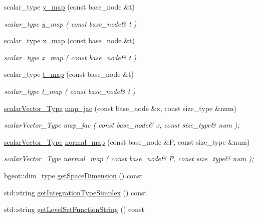 \begin{DoxyCompactItemize}
scalar\-\_\-type \hyperlink{classLevelSetData_aa4cda1cced4bc385d85383b40bbc2631}{y\-\_\-map} (const base\-\_\-node \&t)
\begin{DoxyCompactList}\small\item\em scalar\-\_\-type y\-\_\-map ( const base\-\_\-node\& t ) \end{DoxyCompactList}\item 
scalar\-\_\-type \hyperlink{classLevelSetData_ae7f10d3f10b72fbb6f703ba7aa8fe17b}{x\-\_\-map} (const base\-\_\-node \&t)
\begin{DoxyCompactList}\small\item\em scalar\-\_\-type x\-\_\-map ( const base\-\_\-node\& t ) \end{DoxyCompactList}\item 
scalar\-\_\-type \hyperlink{classLevelSetData_ac5307b31e9aff44c3e0d7cb848c17949}{t\-\_\-map} (const base\-\_\-node \&t)
\begin{DoxyCompactList}\small\item\em scalar\-\_\-type t\-\_\-map ( const base\-\_\-node\& t ) \end{DoxyCompactList}\item 
\hyperlink{Core_8h_a4e75b5863535ba1dd79942de2846eff0}{scalar\-Vector\-\_\-\-Type} \hyperlink{classLevelSetData_a40fcfa36de7ac76613284d03690eb54b}{map\-\_\-jac} (const base\-\_\-node \&x, const size\-\_\-type \&num)
\begin{DoxyCompactList}\small\item\em scalar\-Vector\-\_\-\-Type map\-\_\-jac ( const base\-\_\-node\& x, const size\-\_\-type\& num ); \end{DoxyCompactList}\item 
\hyperlink{Core_8h_a4e75b5863535ba1dd79942de2846eff0}{scalar\-Vector\-\_\-\-Type} \hyperlink{classLevelSetData_a674d56690f4e22cbca38bf4b5f176a5e}{normal\-\_\-map} (const base\-\_\-node \&P, const size\-\_\-type \&num)
\begin{DoxyCompactList}\small\item\em scalar\-Vector\-\_\-\-Type normal\-\_\-map ( const base\-\_\-node\& P, const size\-\_\-type\& num ); \end{DoxyCompactList}\item 
bgeot\-::dim\-\_\-type \hyperlink{classLevelSetData_aa4c3e1f7876cd318e80f5052689fe9e3}{get\-Space\-Dimension} () const 
\item 
std\-::string \hyperlink{classLevelSetData_a3f8cb21a929065136dcf3a449edb373a}{get\-Integration\-Type\-Simplex} () const 
\item 
std\-::string \hyperlink{classLevelSetData_a672418971ce9b1bf71d3c6bccd278bd7}{get\-Level\-Set\-Function\-String} () const 
\end{DoxyCompactItemize}


